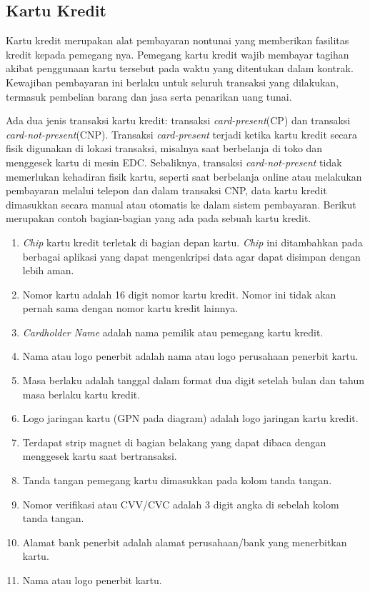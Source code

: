 \subsection{Kartu Kredit} \label{II.KartuKredit}
Kartu kredit merupakan alat pembayaran nontunai yang memberikan fasilitas kredit kepada pemegang nya\cite{wooster1966credit}. Pemegang kartu kredit wajib membayar tagihan  akibat penggunaan kartu tersebut pada waktu yang  ditentukan dalam kontrak\cite{wooster1966credit}. Kewajiban pembayaran ini berlaku untuk seluruh transaksi yang dilakukan, termasuk pembelian barang dan jasa serta penarikan uang tunai\cite{flitcroft2009credit}. 

Ada dua jenis transaksi  kartu kredit: transaksi \textit{card-present}(CP) dan transaksi \textit{card-not-present}(CNP)\cite{kumar2016method}. Transaksi \textit{card-present} terjadi ketika kartu kredit secara fisik digunakan di lokasi transaksi, misalnya saat berbelanja di toko dan menggesek kartu di mesin EDC. Sebaliknya, transaksi \textit{card-not-present} tidak memerlukan kehadiran fisik kartu, seperti saat berbelanja online atau melakukan pembayaran melalui telepon dan dalam transaksi CNP, data kartu kredit dimasukkan secara manual atau otomatis ke dalam sistem pembayaran\cite{kumar2016method}. Berikut merupakan contoh bagian-bagian yang ada pada sebuah kartu kredit.
\begin{enumerate}[noitemsep]
    \item \textit{Chip}  kartu kredit terletak di bagian depan kartu. \textit{Chip} ini ditambahkan pada berbagai aplikasi yang dapat mengenkripsi data agar dapat disimpan dengan lebih aman.
    \item  Nomor kartu adalah 16 digit nomor kartu kredit. Nomor ini tidak akan pernah sama dengan nomor kartu kredit lainnya.
    \item \textit{Cardholder Name} adalah nama  pemilik atau pemegang kartu kredit.
    \item Nama atau logo penerbit adalah nama atau logo perusahaan penerbit kartu.
    \item Masa berlaku adalah tanggal dalam format dua digit setelah bulan dan tahun  masa berlaku kartu kredit.
    \item Logo jaringan kartu (GPN pada diagram) adalah logo jaringan kartu kredit.
    \item Terdapat strip magnet di bagian belakang yang dapat dibaca dengan menggesek kartu saat bertransaksi.
    \item Tanda tangan pemegang kartu dimasukkan pada kolom tanda tangan.
    \item  Nomor verifikasi atau CVV/CVC adalah 3 digit angka di sebelah kolom tanda tangan.
    \item Alamat bank penerbit adalah alamat perusahaan/bank yang menerbitkan kartu.
    \item  Nama atau logo penerbit kartu.
\end{enumerate}
